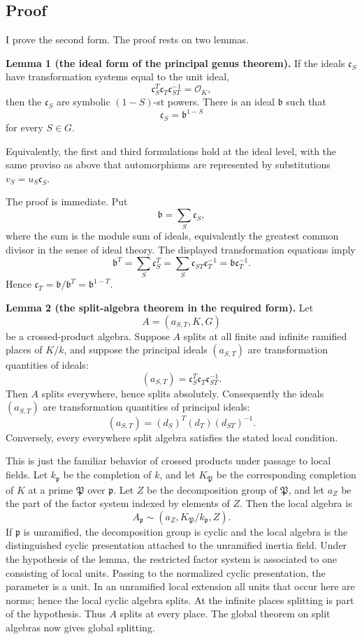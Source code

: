 \documentclass[12pt]{article}
\begin{document}
\subsection{Proof}

I prove the second form. The proof rests on two lemmas.

\textbf{Lemma 1 (the ideal form of the principal genus theorem).} If the ideals \(\mathfrak c_S\) have transformation systems equal to the unit ideal,
\[
  \mathfrak c_S^T\mathfrak c_T\mathfrak c_{ST}^{-1}=\mathcal O_K,
\]
then the \(\mathfrak c_S\) are symbolic \((1-S)\)-st powers. There is an ideal \(\mathfrak b\) such that
\[
  \mathfrak c_S=\mathfrak b^{1-S}
\]
for every \(S\in G\).

Equivalently, the first and third formulations hold at the ideal level, with the same proviso as above that automorphisms are represented by substitutions \(v_S=u_S\mathfrak c_S\).

The proof is immediate. Put
\[
  \mathfrak b=\sum_S \mathfrak c_S,
\]
where the sum is the module sum of ideals, equivalently the greatest common divisor in the sense of ideal theory. The displayed transformation equations imply
\[
  \mathfrak b^T=\sum_S \mathfrak c_S^T=\sum_S \mathfrak c_{ST}\mathfrak c_T^{-1}=\mathfrak b\mathfrak c_T^{-1}.
\]
Hence \(\mathfrak c_T=\mathfrak b/\mathfrak b^T=\mathfrak b^{1-T}\).

\textbf{Lemma 2 (the split-algebra theorem in the required form).} Let
\[
  A=(a_{S,T},K,G)
\]
be a crossed-product algebra. Suppose \(A\) splits at all finite and infinite ramified places of \(K/k\), and suppose the principal ideals \((a_{S,T})\) are transformation quantities of ideals:
\[
  (a_{S,T})=\mathfrak c_S^T\mathfrak c_T\mathfrak c_{ST}^{-1}.
\]
Then \(A\) splits everywhere, hence splits absolutely. Consequently the ideals \((a_{S,T})\) are transformation quantities of principal ideals:
\[
  (a_{S,T})=(d_S)^T(d_T)(d_{ST})^{-1}.
\]
Conversely, every everywhere split algebra satisfies the stated local condition.

This is just the familiar behavior of crossed products under passage to local fields. Let \(k_{\mathfrak p}\) be the completion of \(k\), and let \(K_{\mathfrak P}\) be the corresponding completion of \(K\) at a prime \(\mathfrak P\) over \(\mathfrak p\). Let \(Z\) be the decomposition group of \(\mathfrak P\), and let \(a_Z\) be the part of the factor system indexed by elements of \(Z\). Then the local algebra is
\[
  A_{\mathfrak p}\sim (a_Z,K_{\mathfrak P}/k_{\mathfrak p},Z).
\]
If \(\mathfrak p\) is unramified, the decomposition group is cyclic and the local algebra is the distinguished cyclic presentation attached to the unramified inertia field. Under the hypothesis of the lemma, the restricted factor system is associated to one consisting of local units. Passing to the normalized cyclic presentation, the parameter is a unit. In an unramified local extension all units that occur here are norms; hence the local cyclic algebra splits. At the infinite places splitting is part of the hypothesis. Thus \(A\) splits at every place. The global theorem on split algebras now gives global splitting.
\end{document}
